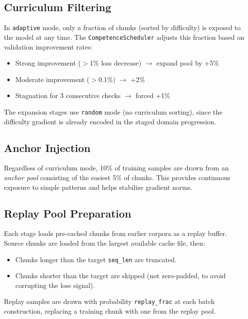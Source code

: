 \subsection{Curriculum Filtering}

In \texttt{adaptive} mode, only a fraction of chunks (sorted by difficulty) is
exposed to the model at any time.  The \texttt{CompetenceScheduler} adjusts
this fraction based on validation improvement rates:
\begin{itemize}[nosep]
  \item Strong improvement ($>$1\% loss decrease) $\to$ expand pool by +5\%
  \item Moderate improvement ($>$0.1\%) $\to$ +2\%
  \item Stagnation for 3 consecutive checks $\to$ forced +1\%
\end{itemize}
The expansion stages use \texttt{random} mode (no curriculum sorting), since
the difficulty gradient is already encoded in the staged domain progression.

\subsection{Anchor Injection}

Regardless of curriculum mode, 10\% of training samples are drawn from an
\emph{anchor pool} consisting of the easiest 5\% of chunks.  This provides
continuous exposure to simple patterns and helps stabilize gradient norms.

\subsection{Replay Pool Preparation}

Each stage loads pre-cached chunks from earlier corpora as a replay buffer.
Source chunks are loaded from the largest available cache file, then:
\begin{itemize}[nosep]
  \item Chunks longer than the target \texttt{seq\_len} are truncated.
  \item Chunks shorter than the target are skipped (not zero-padded, to avoid
        corrupting the loss signal).
\end{itemize}
Replay samples are drawn with probability \texttt{replay\_frac} at each batch
construction, replacing a training chunk with one from the replay pool.
